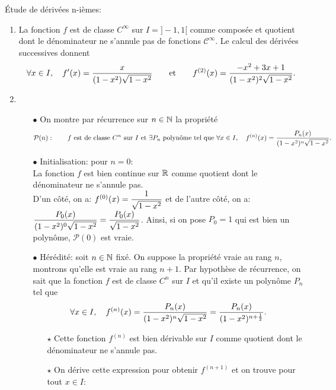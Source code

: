 \documentclass[a4paper, 11pt,reqno]{article}
\begin{document}
\begin{correction}  \;
	\'Etude de d\'eriv\'ees n-i\`emes:
	\begin{enumerate}
		\item La fonction $f$ est de classe $C^{\infty}$ sur $I=\rbrack -1,1\lbrack$ comme compos\'ee et quotient dont le d\'enominateur ne s'annule
		      pas de fonctions $\mathcal{C}^{\infty}$. Le calcul des d\'eriv\'ees successives donnent
		      $$\forall x\in I,\quad f^{\prime}(x)=\ddp\frac{x}{(1-x^2)\sqrt{1-x^2}}\qquad\hbox{et}\qquad f^{(2)}(x)=\ddp\frac{-x^2+3x+1}{(1-x^2)^2\sqrt{1-x^2}}.$$
		\item
		      \begin{itemize}
			      \item[$\bullet$] On montre par r\'ecurrence sur $n\in\N$ la propri\'et\'e
			            $$\mathcal{P}(n):\quad \quad f\ \hbox{est de classe}\ C^n\ \hbox{sur}\ I\ \hbox{et}\ \exists P_n\ \hbox{polyn\^ome tel que}\ \forall x\in I,\quad f^{(n)}(x)=\ddp\frac{P_n(x)}{(1-x^2)^n \sqrt{1-x^2}}.$$
			      \item[$\bullet$]  Initialisation: pour $n=0$:\\
			            \noindent La fonction $f$ est bien continue sur $\R$ comme quotient dont le d\'enominateur ne s'annule pas.\\
			            \noindent D'un c\^ot\'e, on a: $f^{(0)}(x)=\ddp\frac{1}{\sqrt{1-x^2}}$ et de l'autre c\^ot\'e, on a: $\ddp\frac{P_0(x)}{(1-x^2)^0\sqrt{1-x^2}}=\ddp\frac{P_0(x)}{\sqrt{1-x^2}}$. Ainsi, si on pose $P_0=1$ qui est bien un polyn\^ome, $\mathcal{P}(0)$ est vraie.
			      \item[$\bullet$] H\'er\'edit\'e: soit $n\in\N$ fix\'e. On suppose la propri\'et\'e vraie au rang $n$, montrons qu'elle est vraie au rang $n+1$. Par hypoth\`ese de r\'ecurrence, on sait que la fonction $f$ est de classe $C^n$ sur $I$ et qu'il existe un polyn\^ome $P_n$ tel que
			            $$\forall x\in I,\quad f^{(n)}(x)=\ddp\frac{P_n(x)}{(1-x^2)^n\sqrt{1-x^2}} = \frac{P_n(x)}{(1-x^2)^{n+\frac{1}{2}}}.$$
			            \begin{itemize}
				            \item[$\star$] Cette fonction $f^{(n)}$ est bien d\'erivable sur $I$ comme quotient dont le d\'enominateur ne s'annule pas.
				            \item[$\star$]
				                  On d\'erive cette expression pour obtenir $f^{(n+1)}$ et on trouve pour tout $x\in I$:
				                  $$\begin{array}{lll}

\end{array}$$
\end{itemize}
\end{itemize}
\end{enumerate}
\end{correction}
\end{document}
